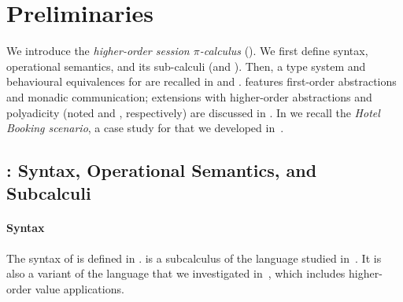 \documentclass[preprint,11pt]{elsarticle}
\begin{document}
{%

\section{Preliminaries}
\label{sec:prelim}

We introduce 
the \emph{higher-order session $\pi$-calculus} (\HOp).
We first define 
syntax, operational semantics, and 
its sub-calculi (\sessp and \HO).
Then, a type system and behavioural equivalences for \HOp are recalled in 
 and . 
\HOp features first-order abstractions and monadic communication; extensions 
with higher-order abstractions and polyadicity (noted \HOpp and \PHOp, respectively) 
are discussed in .
In  we recall the \emph{Hotel Booking scenario}, a case study for \HOp that we developed in~\cite{characteristic_bis,KouzapasPY17}.




\subsection{\HOp: Syntax, Operational Semantics, and Subcalculi}
\label{subsec:syntax}

\paragraph{Syntax}
The syntax of \HOp is defined in .
\HOp  is a subcalculus of the language studied 
in~\cite{tlca07}. It is also a variant of the language that we investigated in~\cite{characteristic_bis}, 
which includes higher-order value applications. 




}
\end{document}
